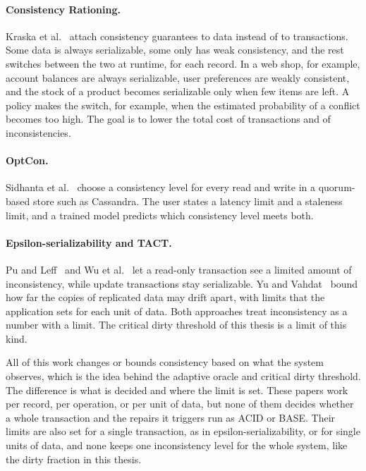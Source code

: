 \paragraph{Consistency Rationing.} Kraska et al.~\cite{kraska2009rationing}
attach consistency guarantees to data instead of to transactions. Some data is
always serializable, some only has weak consistency, and the rest switches
between the two at runtime, for each record. In a web shop, for example, account
balances are always serializable, user preferences are weakly consistent, and
the stock of a product becomes serializable only when few items are left. A
policy makes the switch, for example, when the estimated probability of a
conflict becomes too high. The goal is to lower the total cost of transactions
and of inconsistencies.


\paragraph{OptCon.} Sidhanta et al.~\cite{sidhanta2016optcon} choose a
consistency level for every read and write in a quorum-based store such as
Cassandra. The user states a latency limit and a staleness limit, and a trained
model predicts which consistency level meets both.

\paragraph{Epsilon-serializability and TACT.} Pu and Leff~\cite{pu1991esr} and
Wu et al.~\cite{wu1992divergence} let a read-only transaction see a limited
amount of inconsistency, while update transactions stay serializable. Yu and
Vahdat~\cite{yu2000conit} bound how far the copies of replicated data may drift
apart, with limits that the application sets for each unit of data. Both approaches treat
inconsistency as a number with a limit. The critical dirty threshold of this
thesis is a limit of this kind.

\vspace{1.8ex plus .4ex minus .2ex}
\noindent All of this work changes or bounds consistency based on what the system
observes, which is the idea behind the adaptive oracle and critical dirty
threshold. The difference is what is decided and where the limit is set.
These papers work per record, per operation, or per unit of data, but none of them
decides whether a whole transaction and the repairs it triggers run as ACID or
BASE. Their limits are also set for a single transaction, as in
epsilon-serializability, or for single units of data, and none keeps one
inconsistency level for the whole system, like the dirty fraction in
this thesis.

